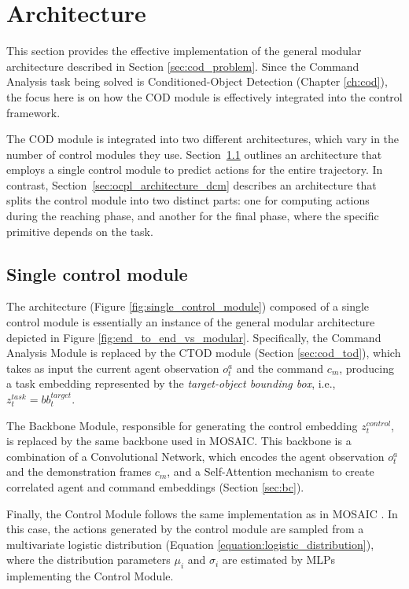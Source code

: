 \section{Architecture}
\label{sec:ocpl_architecture}
This section provides the effective implementation of the general modular architecture described in Section \ref{sec:cod_problem}. Since the Command Analysis task being solved is Conditioned-Object Detection (Chapter \ref{ch:cod}), the focus here is on how the COD module is effectively integrated into the control framework.

The COD module is integrated into two different architectures, which vary in the number of control modules they use. Section~\ref{sec:ocpl_architecture_scm} outlines an architecture that employs a single control module to predict actions for the entire trajectory. In contrast, Section~\ref{sec:ocpl_architecture_dcm} describes an architecture that splits the control module into two distinct parts: one for computing actions during the reaching phase, and another for the final phase, where the specific primitive depends on the task.

\subsection{Single control module}
\label{sec:ocpl_architecture_scm}
The architecture (Figure \ref{fig:single_control_module}) composed of a single control module is essentially an instance of the general modular architecture depicted in Figure \ref{fig:end_to_end_vs_modular}. Specifically, the Command Analysis Module is replaced by the CTOD module (Section \ref{sec:cod_tod}), which takes as input the current agent observation $o^a_t$ and the command $c_m$, producing a task embedding represented by the \textit{target-object bounding box}, i.e., $z^{task}_t = bb^{target}_t$.

The Backbone Module, responsible for generating the control embedding $z^{control}_{t}$, is replaced by the same backbone used in MOSAIC. This backbone is a combination of a Convolutional Network, which encodes the agent observation $o^a_t$ and the demonstration frames $c_m$, and a Self-Attention mechanism to create correlated agent and command embeddings (Section \ref{sec:bc}). 

Finally, the Control Module follows the same implementation as in MOSAIC \cite{mandi2022towards_more_generalizable_one_shot}. In this case, the actions generated by the control module are sampled from a multivariate logistic distribution (Equation \ref{equation:logistic_distribution}), where the distribution parameters $\mu_{i}$ and $\sigma_{i}$ are estimated by MLPs implementing the Control Module.

